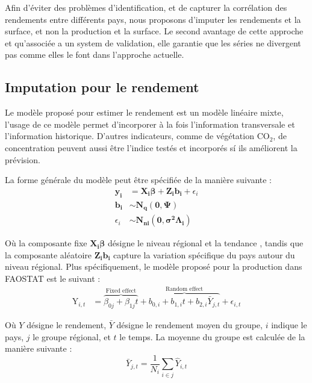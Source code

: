 \documentclass[nojss]{jss}\usepackage{graphicx, color}
\begin{document}
Afin d'\'{e}viter des probl\`{e}mes d'identification, et de capturer
la corr\'{e}lation des rendements entre diff\'{e}rents pays, nous
proposons d'imputer les rendements et la surface, et non la production
et la surface. Le second avantage de cette approche et qu'associ\'{e}e
a un system de validation, elle garantie que les s\'{e}ries ne
divergent pas comme elles le font dans l'approche actuelle.

\subsection{Imputation pour le rendement}
Le mod\`{e}le propos\'{e} pour estimer le rendement est un mod\`{e}le
lin\'{e}aire mixte, l'usage de ce mod\`{e}le permet d'incorporer \`{a}
la fois l'information transversale et l'information
historique. D'autres indicateurs, comme de v\'{e}g\'{e}tation
$\text{CO}_2$, de concentration peuvent aussi \^{e}tre l'indice
test\'{e}s et incorpor\'{e}s s\'{i} ils am\'{e}liorent la pr\'{e}vision.

La forme g\'{e}n\'{e}rale du mod\`{e}le peut \^{e}tre
sp\'{e}cifi\'{e}e de la mani\`{e}re suivante :
\begin{align}
  \mathbf{y_i} &= \mathbf{X_i}\boldsymbol{\beta} +
  \mathbf{Z_i}\mathbf{b_i} + \epsilon_i \nonumber\\
  \mathbf{b_i} &\sim \mathbf{N_q}(\mathbf{0}, \boldsymbol{\Psi})\nonumber\\
  \epsilon_i &\sim \mathbf{N_{ni}}(\mathbf{0},
  \boldsymbol{\sigma^2}\boldsymbol{\Lambda_i})
\end{align}

O\`{u} la composante fixe $\mathbf{X_i}\boldsymbol{\beta}$ d\'{e}signe
le niveau r\'{e}gional et la tendance , tandis que la composante
al\'{e}atoire $\mathbf{Z_i}\mathbf{b_i}$ capture la variation
sp\'{e}cifique du pays autour du niveau r\'{e}gional. Plus
sp\'{e}cifiquement, le mod\`{e}le propos\'{e} pour la production dans
FAOSTAT est le suivant :
\begin{align}
  \label{eq:lmeImpute}
  \text{Y}_{i,t} &= \overbrace{\beta_{0j} + \beta_{1j}t}^{\text{Fixed
      effect}} + \overbrace{b_{0,i} + b_{1,i}t +
    b_{2,i}\bar{Y}_{j,t}}^{\text{Random effect}} + \epsilon_{i,t}
\end{align}

O\`{u} $Y$ d\'{e}signe le rendement, $\bar{Y}$ d\'{e}signe le rendement
moyen du groupe, $i$ indique le pays, $j$ le groupe r\'{e}gional, et
$t$ le temps. La moyenne du groupe est calcul\'{e}e de la mani\`{e}re
suivante :
\begin{equation}
  \label{eq:averageYield}
  \bar{Y}_{j, t} = \frac{1}{N_i}\sum_{i \in j} \hat{Y}_{i,t}
\end{equation}
\end{document}
